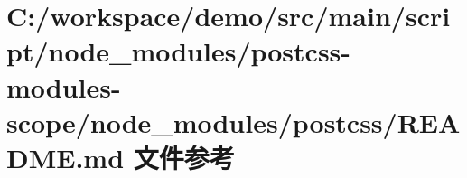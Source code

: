 \hypertarget{node__modules_2postcss-modules-scope_2node__modules_2postcss_2_r_e_a_d_m_e_8md}{}\section{C\+:/workspace/demo/src/main/script/node\+\_\+modules/postcss-\/modules-\/scope/node\+\_\+modules/postcss/\+R\+E\+A\+D\+ME.md 文件参考}
\label{node__modules_2postcss-modules-scope_2node__modules_2postcss_2_r_e_a_d_m_e_8md}
